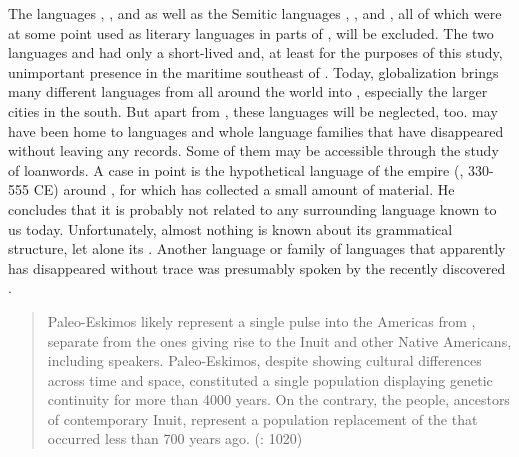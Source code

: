 The  languages , , and  as well as the Semitic languages , , and , all of which were at some point used as literary languages in parts of , will be excluded. The two  languages  and  had only a short-lived and, at least for the purposes of this study, unimportant presence in the maritime southeast of . Today, globalization brings many different languages from all around the world into , especially the larger cities in the south. But apart from , these languages will be neglected, too.  may have been home to languages and whole language families that have disappeared without leaving any records. Some of them may be accessible through the study of loanwords. A case in point is the hypothetical language of the  empire (, 330-555 CE) around , for which \citet{Vovin2004} has collected a small amount of material. He concludes that it is probably not related to any surrounding language known to us today. Unfortunately, almost nothing is known about its grammatical structure, let alone its . Another language or family of languages that apparently has disappeared without trace \citep{Fortescue2013} was presumably spoken by the recently discovered \textit{}.

\begin{quote}
Paleo-Eskimos likely represent a single  pulse into the Americas from , separate from the ones giving rise to the Inuit and other Native Americans, including  speakers. Paleo-Eskimos, despite showing cultural differences across time and space, constituted a single population displaying genetic continuity for more than 4000 years. On the contrary, the  people, ancestors of contemporary Inuit, represent a population replacement of the  that occurred less than 700 years ago. (\citealt{RaghavanDeGiorgio2014}: 1020)
\end{quote}

